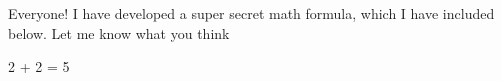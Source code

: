 Everyone! I have developed a super secret math formula, which I have included below. Let me know what you think


2 + 2 = 5
